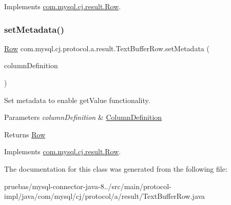 Implements \mbox{\hyperlink{interfacecom_1_1mysql_1_1cj_1_1result_1_1_row_aaf07357d53c30067dfa87183a1e60a18}{com.\+mysql.\+cj.\+result.\+Row}}.

\mbox{\label{classcom_1_1mysql_1_1cj_1_1protocol_1_1a_1_1result_1_1_text_buffer_row_a09f38001a62bec7e4723062fb7b1c156}} 
\subsubsection{\texorpdfstring{set\+Metadata()}{setMetadata()}}
{\footnotesize\ttfamily \mbox{\hyperlink{interfacecom_1_1mysql_1_1cj_1_1result_1_1_row}{Row}} com.\+mysql.\+cj.\+protocol.\+a.\+result.\+Text\+Buffer\+Row.\+set\+Metadata (\begin{DoxyParamCaption}\item[{\mbox{\hyperlink{interfacecom_1_1mysql_1_1cj_1_1protocol_1_1_column_definition}{Column\+Definition}}}]{column\+Definition }\end{DoxyParamCaption})}

Set metadata to enable get\+Value functionality.


\begin{DoxyParams}{Parameters}
{\em column\+Definition} & \mbox{\hyperlink{interfacecom_1_1mysql_1_1cj_1_1protocol_1_1_column_definition}{Column\+Definition}} \\
\hline
\end{DoxyParams}
\begin{DoxyReturn}{Returns}
\mbox{\hyperlink{}{Row}} 
\end{DoxyReturn}


Implements \mbox{\hyperlink{interfacecom_1_1mysql_1_1cj_1_1result_1_1_row_ab80b0f47123d2771840acead9bc094d0}{com.\+mysql.\+cj.\+result.\+Row}}.



The documentation for this class was generated from the following file\+:\begin{DoxyCompactItemize}
\item 
pruebas/mysql-\/connector-\/java-\/8../src/main/protocol-\/impl/java/com/mysql/cj/protocol/a/result/Text\+Buffer\+Row.\+java\end{DoxyCompactItemize}
